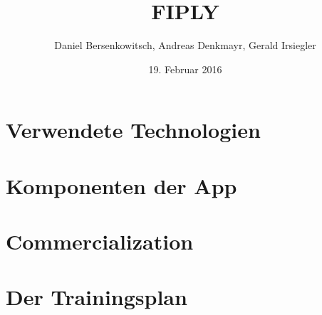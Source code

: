 \documentclass[a4paper, 12pt]{article}
\title{FIPLY}
\author{Daniel Bersenkowitsch, Andreas Denkmayr, Gerald Irsiegler}
\date{19. Februar 2016}
\begin{document}
\maketitle
\tableofcontents

\newpage


\newpage %
\section{Verwendete Technologien}

\newpage


\newpage
%





\newpage %
\section{Komponenten der App}

\newpage


\newpage


\newpage


\newpage


\newpage


\newpage


\newpage


\newpage


\newpage
\section{Commercialization}
 
\newpage
 
\newpage

% 
% 
%
\newpage
 

\newpage
\section{Der Trainingsplan}


\newpage
\printbibliography
\end{document}
